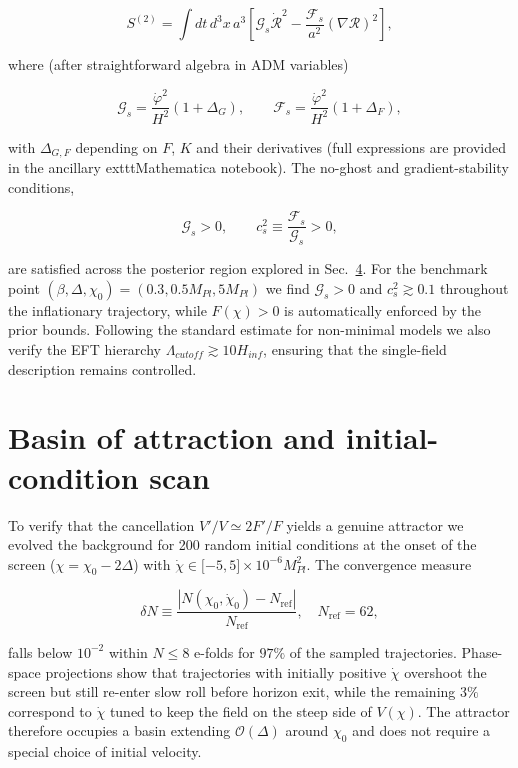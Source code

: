 \documentclass[
]{article}
\begin{document}
\[
S^{(2)} = \int dt\, d^{3}x\, a^{3}\left\lbrack \mathcal{G}_{s}{\dot{\mathcal{R}}}^{2} - \frac{\mathcal{F}_{s}}{a^{2}}(\nabla\mathcal{R})^{2} \right\rbrack,
\]

where (after straightforward algebra in ADM variables)

\[
\mathcal{G}_{s} = \frac{{\dot{\varphi}}^{2}}{H^{2}}\left( 1 + \Delta_{G} \right),\quad\quad\mathcal{F}_{s} = \frac{{\dot{\varphi}}^{2}}{H^{2}}\left( 1 + \Delta_{F} \right),
\]

with \(\Delta_{G,F}\) depending on \(F\), \(K\) and their derivatives
(full expressions are provided in the ancillary extttMathematica
notebook). The no-ghost and gradient-stability conditions,

\[
\mathcal{G}_{s} > 0,\quad\quad c_{s}^{2} \equiv \frac{\mathcal{F}_{s}}{\mathcal{G}_{s}} > 0,
\]

are satisfied across the posterior region explored in
Sec.~\hyperref[sec:inflationary-observables]{4}. For the benchmark point
\((\beta,\Delta,\chi_{0}) = (0.3,0.5M_{Pl},5M_{Pl})\) we find
\(\mathcal{G}_{s} > 0\) and \(c_{s}^{2} \gtrsim 0.1\) throughout the
inflationary trajectory, while \(F(\chi) > 0\) is automatically enforced
by the prior bounds. Following the standard estimate for non-minimal
models we also verify the EFT hierarchy
\(\Lambda_{cutoff} \gtrsim 10H_{inf}\), ensuring that the single-field
description remains controlled.

\section{Basin of attraction and initial-condition
scan}\label{basin-of-attraction-and-initial-condition-scan}

To verify that the cancellation \(V'/V \simeq 2F'/F\) yields a genuine
attractor we evolved the background for 200 random initial conditions at
the onset of the screen (\(\chi = \chi_{0} - 2\Delta\)) with
\(\dot{\chi} \in \lbrack - 5,5 \rbrack \times 10^{- 6}M_{Pl}^{2}\). The
convergence measure

\[
\delta N \equiv \frac{|N(\chi_{0},\dot{\chi}_{0}) - N_{\text{ref}}|}{N_{\text{ref}}},\quad N_{\text{ref}} = 62,
\]

falls below \(10^{- 2}\) within \(N \leq 8\) e-folds for \(97\%\) of the
sampled trajectories. Phase-space projections show that trajectories
with initially positive \(\dot{\chi}\) overshoot the screen but still
re-enter slow roll before horizon exit, while the remaining \(3\%\)
correspond to \(\dot{\chi}\) tuned to keep the field on the steep side
of \(V(\chi)\). The attractor therefore occupies a basin extending
\(\mathcal{O}(\Delta)\) around \(\chi_{0}\) and does not require a
special choice of initial velocity.
\end{document}
